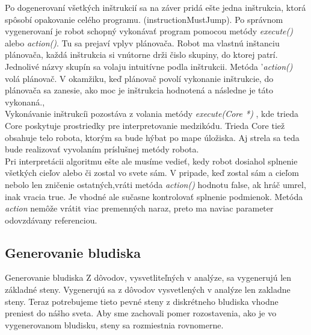Po dogenerovaní všetkých inštrukcií sa na záver pridá ešte jedna inštrukcia, ktorá spôsobí opakovanie celého programu. (instructionMustJump). Po správnom vygenerovaní je robot schopný vykonávať program pomocou metódy {\it execute()} alebo {\it action()}. Tu sa prejaví vplyv plánovača. Robot ma vlastnú inštanciu plánovača, každá inštrukcia si vnútorne drži čislo skupiny, do ktorej patrí. Jednolivé názvy skupín sa volaju intuitívne podla inštrukcii.  Metóda {'\it action()} volá plánovač. V okamžiku, keď plánovač povolí vykonanie inštrukcie, do plánovača sa zanesie, ako moc je inštrukcia hodnotená a následne je táto vykonaná., \\
Vykonávanie inštrukcíi pozostáva z volania metódy {\it execute(Core *) }, kde trieda Core poskytuje prostriedky pre interpretovanie medzikódu. Trieda Core tiež obsahuje telo robota, ktorým sa bude hýbat po mape úložiska. Aj  strela sa teda bude realizovať vyvolaním príslušnej metódy robota. \\
Pri interpretácii algoritmu ešte ale musíme vedieť, kedy robot dosiahol splnenie všetkých cieľov alebo či zostal vo svete sám. V pripade, keď zostal sám a cieľom nebolo len zničenie ostatných,vráti metóda {\it action()} hodnotu false, ak hráč umrel, inak vracia true. Je vhodné ale sučasne kontrolovať splnenie podmienok. Metóda  {\it action } nemôže vrátit viac premenných naraz, preto ma naviac parameter odovzdávany referenciou. 

\subsection{Generovanie bludiska}
Generovanie bludiska
Z dôvodov, vysvetliteľných v analýze, sa vygenerujú len základné steny.  Vygenerujú sa z dôvodov vysvetlených v analýze len zakladne steny. Teraz potrebujeme tieto pevné steny z diskrétneho bludiska vhodne preniest do nášho sveta. Aby sme zachovali pomer rozostavenia, ako je vo vygenerovanom bludisku, steny sa rozmiestnia rovnomerne. 

